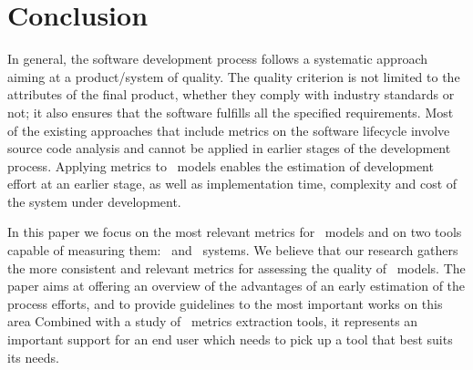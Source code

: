 \section{Conclusion} \label{conc}

In general, the software development process follows a systematic approach aiming at a product/system of quality.
The quality criterion is not limited to the attributes of the final product, whether they comply with industry standards or not; it also ensures that the software fulfills all the specified requirements.
Most of the existing approaches that include metrics on the software lifecycle involve source code analysis and cannot be applied in earlier stages of the development process.
Applying metrics to \uml\ models enables the estimation of development effort at an earlier stage, as well as implementation time, complexity and cost of the system under development.

In this paper we focus on the most relevant metrics for \uml\ models and on two tools capable of measuring them: \sdmetrics\ and  \entArch\ systems.
We believe that our research gathers the more consistent and relevant metrics for assessing the quality of \uml\ models. 
The paper aims at offering an overview of the advantages of an early estimation of the process efforts, and to provide guidelines to the most important works on this area
Combined with a study of \uml\ metrics extraction tools, it represents an important support for an end user which needs to pick up a tool that best suits its needs.


